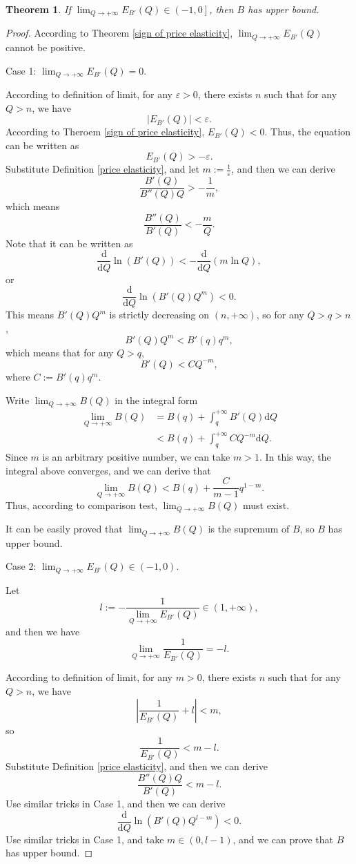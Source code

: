 \documentclass{article}
\newtheorem{theorem}{Theorem}[subsection]
\begin{document}
\begin{theorem}
\label{upper bound of benefit}
If $\lim_{Q\to+\infty}E_{B'}\left(Q\right)\in\left(-1,0\right]$, then $B$ has upper bound.
\end{theorem}
\begin{proof}
According to Theorem \ref{sign of price elasticity},
$\lim_{Q\to+\infty}E_{B'}\left(Q\right)$ cannot be positive.

Case 1: $\lim_{Q\to+\infty}E_{B'}\left(Q\right)=0$.

According to definition of limit, for any $\varepsilon>0$, there exists $n$ such that for any $Q>n$, we have
$$\left|E_{B'}\left(Q\right)\right|<\varepsilon.$$
According to Theroem \ref{sign of price elasticity}, $E_{B'}\left(Q\right)<0$.
Thus, the equation can be written as
$$E_{B'}\left(Q\right)>-\varepsilon.$$
Substitute Definition \ref{price elasticity}, and let $m:=\frac1\varepsilon$, and then we can derive
$$\frac{B'\left(Q\right)}{B''\left(Q\right)Q}>-\frac1m,$$
which means
$$\frac{B''\left(Q\right)}{B'\left(Q\right)}<-\frac mQ.$$
Note that it can be written as
$$\frac{\mathrm d}{\mathrm dQ}\ln\left(B'\left(Q\right)\right)<-\frac{\mathrm d}{\mathrm dQ}\left(m\ln Q\right),$$
or
$$\frac{\mathrm d}{\mathrm dQ}\ln\left(B'\left(Q\right)Q^m\right)<0.$$
This means $B'\left(Q\right)Q^m$ is strictly decreasing on $\left(n,+\infty\right)$,
so for any $Q>q>n$,
$$B'\left(Q\right)Q^m<B'\left(q\right)q^m,$$
which means that for any $Q>q$,
$$B'\left(Q\right)<CQ^{-m},$$
where $C:=B'\left(q\right)q^m$.

Write $\lim_{Q\to+\infty}B\left(Q\right)$ in the integral form
\begin{align*}
\lim_{Q\to+\infty}B\left(Q\right)&=B\left(q\right)+\int_q^{+\infty}B'\left(Q\right)\mathrm dQ\\
&<B\left(q\right)+\int_q^{+\infty}CQ^{-m}\mathrm dQ.
\end{align*}
Since $m$ is an arbitrary positive number, we can take $m>1$.
In this way, the integral above converges, and we can derive that
$$\lim_{Q\to+\infty}B\left(Q\right)<B\left(q\right)+\frac C{m-1}q^{1-m}.$$
Thus, according to comparison test, $\lim_{Q\to+\infty}B\left(Q\right)$ must exist.

It can be easily proved that $\lim_{Q\to+\infty}B\left(Q\right)$ is the supremum of $B$, so $B$ has upper bound.

Case 2: $\lim_{Q\to+\infty}E_{B'}\left(Q\right)\in\left(-1,0\right)$.

Let
$$l:=-\frac1{\lim_{Q\to+\infty}E_{B'}\left(Q\right)}\in\left(1,+\infty\right),$$
and then we have
$$\lim_{Q\to+\infty}\frac1{E_{B'}\left(Q\right)}=-l.$$

According to definition of limit, for any $m>0$, there exists $n$ such that for any $Q>n$, we have
$$\left|\frac1{E_{B'}\left(Q\right)}+l\right|<m,$$
so
$$\frac1{E_{B'}\left(Q\right)}<m-l.$$
Substitute Definition \ref{price elasticity}, and then we can derive
$$\frac{B''\left(Q\right)Q}{B'\left(Q\right)}<m-l.$$
Use similar tricks in Case 1, and then we can derive
$$\frac{\mathrm d}{\mathrm dQ}\ln\left(B'\left(Q\right)Q^{l-m}\right)<0.$$
Use similar tricks in Case 1, and take $m\in\left(0,l-1\right)$,
and we can prove that $B$ has upper bound.
\end{proof}
\end{document}
